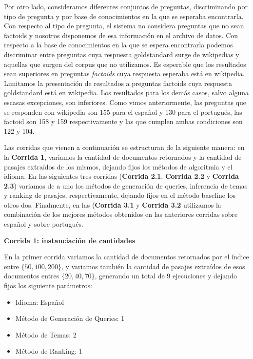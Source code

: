 Por otro lado, consideramos diferentes conjuntos de preguntas, discriminando por tipo de pregunta y por base de conocimientos en la que se esperaba encontrarla. Con respecto al tipo de pregunta, el sistema no considera preguntas que no sean factoids y nosotros disponemos de esa información en el archivo de datos. Con respecto a la base de conocimientos en la que se espera encontrarla podemos discriminar entre preguntas cuya respuesta goldstandard surge de wikipedias y aquellas que surgen del corpus que no utilizamos. Es esperable que los resultados sean superiores en preguntas \textit{factoids} cuya respuesta esperaba está en wikipedia.
Limitamos la presentación de resultados a preguntas factoids cuya respuesta goldstandard está en wikipedia. Los resultados para los demás casos, salvo alguna escasas excepciones, son inferiores. Como vimos anteriormente, las preguntas que se responden con wikipedia son 155 para el español y 130 para el portugués, las factoid son 158 y 159 respectivamente y las que cumplen ambas condiciones son 122
 y 104. \newline

Las corridas que vienen a continuación se estructuran de la siguiente manera: en la \textbf{Corrida 1}, variamos la cantidad de documentos retornados y la cantidad de pasajes extraídos de los mismos, dejando fijos los métodos de algoritmia y el idioma. En las siguientes tres corridas (\textbf{Corrida 2.1},  \textbf{Corrida 2.2} y \textbf{Corrida 2.3}) variamos de a uno los métodos de generación de queries, inferencia de temas y ranking de pasajes, respectivamente, dejando fijos en el método baseline los otros dos. Finalmente, en las (\textbf{Corrida 3.1} y \textbf{Corrida 3.2} utilizamos la combinación de los mejores métodos obtenidos en las anteriores corridas sobre español y sobre portugués. \newline

\textbf{Corrida 1: instanciación de cantidades} \newline

En la primer corrida variamos la cantidad de documentos retornados por el índice entre $\{50, 100, 200\}$, y variamos también la cantidad de pasajes extraídos de esos documentos entres $\{20, 40, 70\}$, generando un total de 9 ejecuciones y dejando fijos los siguiente parámetros: \newline

\begin{itemize}
  \item Idioma: Español
  \item Método de Generación de Queries: 1
  \item Método de Temas: 2
  \item Método de Ranking: 1
\end{itemize}

